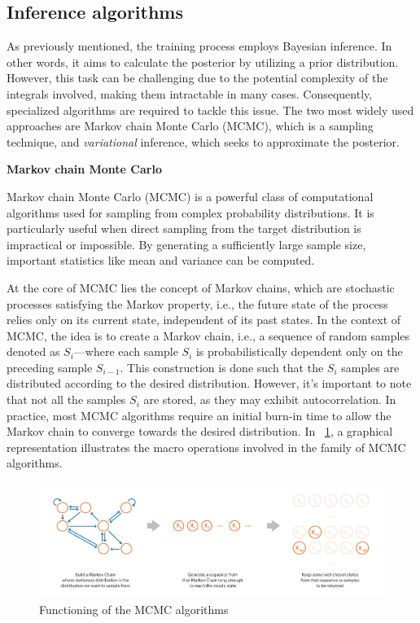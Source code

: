 \subsection{Inference algorithms}

As previously mentioned, the training process employs Bayesian inference. In other words, it aims to calculate the posterior by utilizing a prior distribution. However, this task can be challenging due to the potential complexity of the integrals involved, making them intractable in many cases. Consequently, specialized algorithms are required to tackle this issue. The two most widely used approaches are Markov chain Monte Carlo (MCMC), which is a sampling technique, and \textit{variational} inference, which seeks to approximate the posterior.

\vspace{0.2cm}
\textbf{Markov chain Monte Carlo}

Markov chain Monte Carlo (MCMC) is a powerful class of computational algorithms used for sampling from complex probability distributions. It is particularly useful when direct sampling from the target distribution is impractical or impossible. By generating a sufficiently large sample size, important statistics like mean and variance can be computed.

At the core of MCMC lies the concept of Markov chains, which are stochastic processes satisfying the Markov property, i.e., the future state of the process relies only on its current state, independent of its past states. 
In the context of MCMC, the idea is to create a Markov chain, i.e., a sequence of random samples denoted as $S_i$—where each sample $S_i$ is probabilistically dependent only on the preceding sample $S_{i-1}$. 
This construction is done such that the $S_i$ samples are distributed according to the desired distribution. However, it's important to note that not all the samples $S_i$ are stored, as they may exhibit autocorrelation. In practice, most MCMC algorithms require an initial burn-in time to allow the Markov chain to converge towards the desired distribution.
In \Fig~\ref{fig:mcmc}, a graphical representation illustrates the macro operations involved in the family of MCMC algorithms.

\begin{figure}[h]
	\centering
	\includegraphics[width=0.8\linewidth]{ImageFiles/BayesianNeuralNetworks/mcmc}
	\caption{Functioning of the MCMC algorithms \cite{BIPMCMCV}}
	\label{fig:mcmc}
\end{figure}

